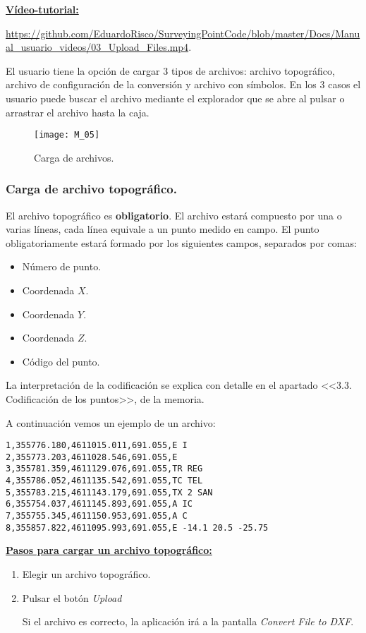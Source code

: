 \textbf{\underline{Vídeo-tutorial:}}

\url{https://github.com/EduardoRisco/SurveyingPointCode/blob/master/Docs/Manual_usuario_videos/03_Upload_Files.mp4}.

El usuario tiene la opción de cargar 3 tipos de archivos: archivo topográfico, archivo de configuración de la conversión y archivo con símbolos. En los 3 casos el usuario puede buscar el archivo mediante el explorador que se abre al pulsar o arrastrar el archivo hasta la caja.

\begin{figure}[H]
	\centering
	\texttt{[image: M\_05]}
	\caption{Carga de archivos.}
	\label{fig:M_05}
\end{figure}

\subsubsection{Carga de archivo topográfico.}

El archivo topográfico es \textbf{obligatorio}. El archivo estará compuesto por una o varias líneas, cada línea equivale a un punto medido en campo. El punto obligatoriamente estará formado por los siguientes campos, separados por comas:
\begin{itemize}
\item Número de punto.
\item Coordenada $X$.
\item Coordenada $Y$.
\item Coordenada $Z$.
\item Código del punto.
\end{itemize}
La interpretación de la codificación se explica con detalle en el apartado <<3.3. Codificación de los puntos>>, de la memoria.



A continuación vemos un ejemplo de un archivo:

\begin{verbatim}
1,355776.180,4611015.011,691.055,E I
2,355773.203,4611028.546,691.055,E
3,355781.359,4611129.076,691.055,TR REG
4,355786.052,4611135.542,691.055,TC TEL
5,355783.215,4611143.179,691.055,TX 2 SAN
6,355754.037,4611145.893,691.055,A IC
7,355755.345,4611150.953,691.055,A C
8,355857.822,4611095.993,691.055,E -14.1 20.5 -25.75
\end{verbatim}

\textbf{\underline{Pasos para cargar un archivo topográfico:} }

\begin{enumerate}

\item Elegir un archivo topográfico.
\item Pulsar el botón \emph{Upload}

Si el archivo es correcto, la aplicación irá a la pantalla \emph{Convert File to DXF}.

\end{enumerate}

